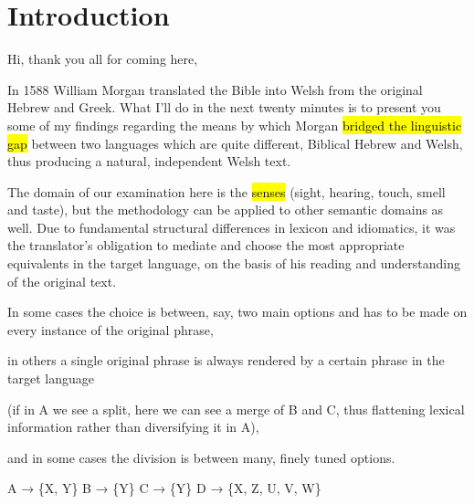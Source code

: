 \section{Introduction}

\begin{paper}
	{\click} Hi, thank you all for coming here,

	{\click} In 1588 William Morgan translated the Bible into Welsh from the original Hebrew and Greek. What I’ll do in the next twenty minutes is to present you some of my findings regarding the means by which Morgan \hl{bridged the linguistic gap} between two languages which are quite different, Biblical Hebrew and Welsh, thus producing a natural, independent Welsh text.

	The domain of our examination here is the \hl{senses} (sight, hearing, touch, smell and taste), but the methodology can be applied to other semantic domains as well. Due to fundamental structural differences in lexicon and idiomatics, it was the translator’s obligation to mediate and choose the most appropriate equivalents in the target language, on the basis of his reading and understanding of the original text.

	\begin{compactitem}
		\item {\click}  In some cases the choice is between, say, two main options and has to be made on every instance of the original phrase,
		\item {} in others a single original phrase is always rendered by a certain phrase in the target language
			\begin{compactitem}
				\item (if in A we see a split, here we can see a merge of B and C, thus flattening lexical information rather than diversifying it in A),
			\end{compactitem}
		\item and in  some cases the division is between many, finely tuned options.
	\end{compactitem}
\end{paper}

\begin{hopoint}
	A → \{X, Y\}\hfill
	B → \{Y\}\hfill
	C → \{Y\}\hfill
	D → \{X, Z, U, V, W\}
\end{hopoint}

